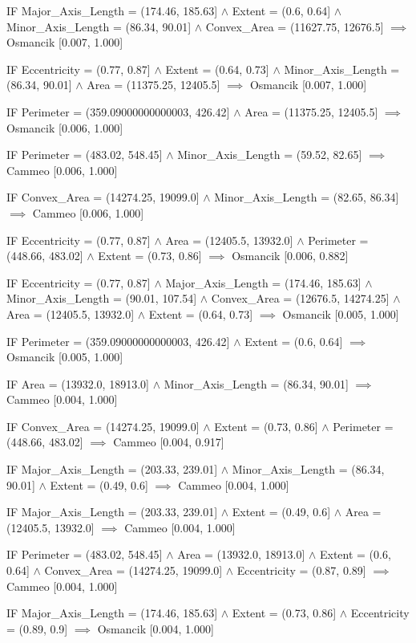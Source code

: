 IF Major_Axis_Length = (174.46, 185.63] $\land$ Extent = (0.6, 0.64] $\land$ Minor_Axis_Length = (86.34, 90.01] $\land$ Convex_Area = (11627.75, 12676.5] $\implies$ Osmancik [0.007, 1.000]

IF Eccentricity = (0.77, 0.87] $\land$ Extent = (0.64, 0.73] $\land$ Minor_Axis_Length = (86.34, 90.01] $\land$ Area = (11375.25, 12405.5] $\implies$ Osmancik [0.007, 1.000]

IF Perimeter = (359.09000000000003, 426.42] $\land$ Area = (11375.25, 12405.5] $\implies$ Osmancik [0.006, 1.000]

IF Perimeter = (483.02, 548.45] $\land$ Minor_Axis_Length = (59.52, 82.65] $\implies$ Cammeo [0.006, 1.000]

IF Convex_Area = (14274.25, 19099.0] $\land$ Minor_Axis_Length = (82.65, 86.34] $\implies$ Cammeo [0.006, 1.000]

IF Eccentricity = (0.77, 0.87] $\land$ Area = (12405.5, 13932.0] $\land$ Perimeter = (448.66, 483.02] $\land$ Extent = (0.73, 0.86] $\implies$ Osmancik [0.006, 0.882]

IF Eccentricity = (0.77, 0.87] $\land$ Major_Axis_Length = (174.46, 185.63] $\land$ Minor_Axis_Length = (90.01, 107.54] $\land$ Convex_Area = (12676.5, 14274.25] $\land$ Area = (12405.5, 13932.0] $\land$ Extent = (0.64, 0.73] $\implies$ Osmancik [0.005, 1.000]

IF Perimeter = (359.09000000000003, 426.42] $\land$ Extent = (0.6, 0.64] $\implies$ Osmancik [0.005, 1.000]

IF Area = (13932.0, 18913.0] $\land$ Minor_Axis_Length = (86.34, 90.01] $\implies$ Cammeo [0.004, 1.000]

IF Convex_Area = (14274.25, 19099.0] $\land$ Extent = (0.73, 0.86] $\land$ Perimeter = (448.66, 483.02] $\implies$ Cammeo [0.004, 0.917]

IF Major_Axis_Length = (203.33, 239.01] $\land$ Minor_Axis_Length = (86.34, 90.01] $\land$ Extent = (0.49, 0.6] $\implies$ Cammeo [0.004, 1.000]

IF Major_Axis_Length = (203.33, 239.01] $\land$ Extent = (0.49, 0.6] $\land$ Area = (12405.5, 13932.0] $\implies$ Cammeo [0.004, 1.000]

IF Perimeter = (483.02, 548.45] $\land$ Area = (13932.0, 18913.0] $\land$ Extent = (0.6, 0.64] $\land$ Convex_Area = (14274.25, 19099.0] $\land$ Eccentricity = (0.87, 0.89] $\implies$ Cammeo [0.004, 1.000]

IF Major_Axis_Length = (174.46, 185.63] $\land$ Extent = (0.73, 0.86] $\land$ Eccentricity = (0.89, 0.9] $\implies$ Osmancik [0.004, 1.000]

